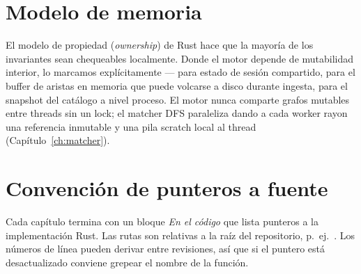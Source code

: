 \section{Modelo de memoria}

El modelo de propiedad (\emph{ownership}) de Rust hace que la
mayoría de los invariantes sean chequeables localmente. Donde el
motor depende de mutabilidad interior, lo marcamos explícitamente
---  para estado de sesión compartido,
 para el buffer de aristas en
memoria que puede volcarse a disco durante ingesta,
 para el snapshot del catálogo a nivel proceso. El
motor nunca comparte grafos mutables entre threads sin un lock; el
matcher DFS paraleliza dando a cada worker rayon una referencia
inmutable y una pila scratch local al thread
(Capítulo~\ref{ch:matcher}).

\section{Convención de punteros a fuente}

Cada capítulo termina con un bloque \emph{En el código} que lista
punteros  a la implementación Rust. Las rutas
son relativas a la raíz del repositorio, p.~ej.\
. Los números de
línea pueden derivar entre revisiones, así que si el puntero está
desactualizado conviene grepear el nombre de la función.
